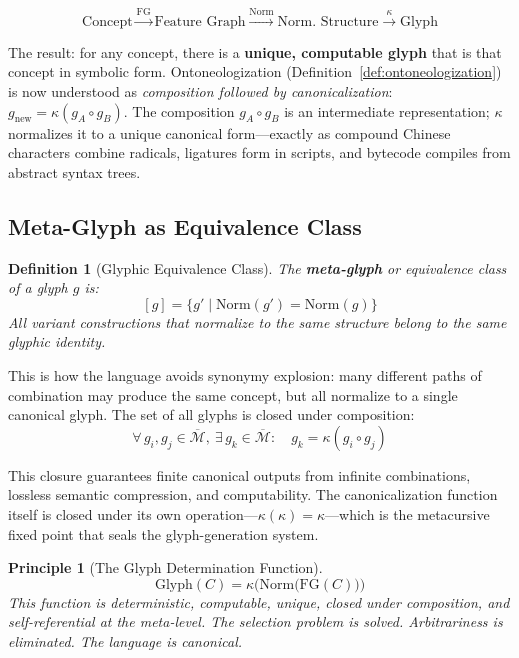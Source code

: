 \documentclass[12pt, letterpaper]{book}
\def\mathfrak#1{#1}%
\newtheorem{definition}{Definition}[chapter]
\newtheorem{principle}{Principle}[chapter]
\begin{document}
\[
\text{Concept} \xrightarrow{\mathrm{FG}} \text{Feature Graph} \xrightarrow{\mathrm{Norm}} \text{Norm. Structure} \xrightarrow{\kappa} \text{Glyph}
\]

The result: for any concept, there is a \textbf{unique, computable glyph} that is that concept in symbolic form. Ontoneologization (Definition~\ref{def:ontoneologization}) is now understood as \textit{composition followed by canonicalization}: $\mathfrak{g}_{\text{new}} = \kappa(\mathfrak{g}_A \circ \mathfrak{g}_B)$. The composition $\mathfrak{g}_A \circ \mathfrak{g}_B$ is an intermediate representation; $\kappa$ normalizes it to a unique canonical form---exactly as compound Chinese characters combine radicals, ligatures form in scripts, and bytecode compiles from abstract syntax trees.

\subsection{Meta-Glyph as Equivalence Class}

\begin{definition}[Glyphic Equivalence Class]\label{def:glyph-equiv}
The \textbf{meta-glyph} or equivalence class of a glyph $\mathfrak{g}$ is:
\[
[\mathfrak{g}] = \{ \mathfrak{g}' \mid \mathrm{Norm}(\mathfrak{g}') = \mathrm{Norm}(\mathfrak{g}) \}
\]
All variant constructions that normalize to the same structure belong to the same glyphic identity.
\end{definition}

This is how the language avoids synonymy explosion: many different paths of combination may produce the same concept, but all normalize to a single canonical glyph. The set of all glyphs is closed under composition:
\[
\forall\, \mathfrak{g}_i, \mathfrak{g}_j \in \overline{\mathcal{M}},\ \exists\, \mathfrak{g}_k \in \overline{\mathcal{M}}: \quad \mathfrak{g}_k = \kappa(\mathfrak{g}_i \circ \mathfrak{g}_j)
\]

This closure guarantees finite canonical outputs from infinite combinations, lossless semantic compression, and computability. The canonicalization function itself is closed under its own operation---$\kappa(\kappa) = \kappa$---which is the metacursive fixed point that seals the glyph-generation system.

\begin{principle}[The Glyph Determination Function]\label{pr:glyph-det}
\[
\boxed{\mathrm{Glyph}(C) = \kappa\big(\mathrm{Norm}\big(\mathrm{FG}(C)\big)\big)}
\]
This function is deterministic, computable, unique, closed under composition, and self-referential at the meta-level. The selection problem is solved. Arbitrariness is eliminated. The language is canonical.
\end{principle}
\end{document}
